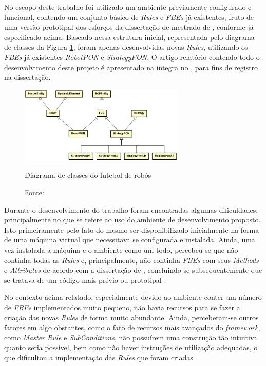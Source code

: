 No escopo deste trabalho foi utilizado um ambiente previamente configurado e
funcional, contendo um conjunto básico de \textit{Rules} e \textit{FBEs} já
existentes, fruto de uma versão prototipal dos esforços da dissertação de
mestrado de , conforme já especificado acima.
Baseado nessa estrutura inicial, representada pelo diagrama de classes da Figura
\ref{fig:class_futebol}, foram apenas desenvolvidas novas \textit{Rules},
utilizando os \textit{FBEs} já existentes \textit{RobotPON} e
\textit{StrategyPON}. O artigo-relatório contendo todo o desenvolvimento deste
projeto é apresentado na íntegra no , para fins de
registro na dissertação.

\begin{figure}[!htb]
    \centering
    \includegraphics[width=0.7\textwidth]{../figures/class_futebol.png}
    \smallskip
    \caption{Diagrama de classes do futebol de robôs}
    \caption*{Fonte: }
    \label{fig:class_futebol}
\end{figure}

\FloatBarrier

Durante o desenvolvimento do trabalho foram encontradas algumas dificuldades,
principalmente no que se refere ao uso do ambiente de desenvolvimento proposto.
Isto primeiramente pelo fato do mesmo ser disponibilizado inicialmente na forma
de uma máquina virtual que necessitava se configurada e instalada. Ainda, uma vez
instalada a máquina e o ambiente como um todo, percebeu-se que não continha
todas as \textit{Rules} e, principalmente, não continha \textit{FBEs} com seus
\textit{Methods} e \textit{Attributes} de acordo com a dissertação de
, concluindo-se subsequentemente que se tratava de
um código mais prévio ou prototipal \cite{lima_2020}.

No contexto acima relatado, especialmente devido ao ambiente conter um número de
\textit{FBEs} implementados muito pequeno, não havia recursos para se fazer a
criação das novas \textit{Rules} de forma muito abundante. Ainda, perceberam-se
outros fatores em algo obstantes, como o fato de recursos mais avançados do
\textit{framework}, como \textit{Master Rule} e \textit{SubConditions}, não
possuírem uma construção tão intuitiva quanto seria possível, bem como não haver
instruções de utilização adequadas, o que dificultou a implementação das
\textit{Rules} que foram criadas.

